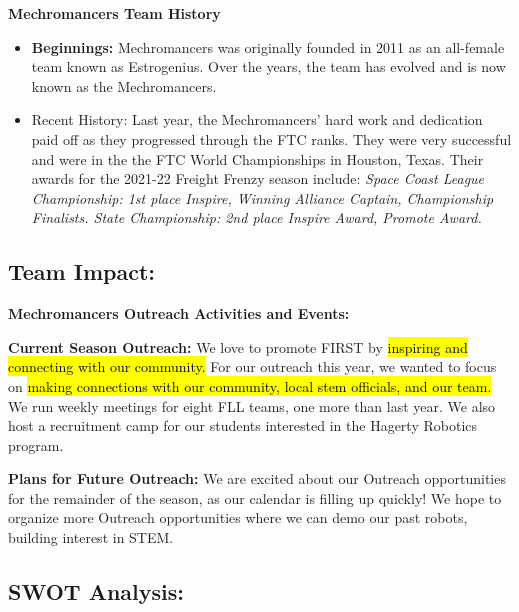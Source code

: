 \textbf{\Large Mechromancers Team History}

\begin{itemize}
\item \textbf{Beginnings:}  Mechromancers was originally founded in 2011 as an {all-female team} known as Estrogenius.  Over the years, the team has evolved and is now known as the Mechromancers.
\item {Recent History:} Last year, the Mechromancers' hard work and dedication paid off as they progressed through the FTC ranks. They were very successful and were in the { the FTC World Championships in Houston, Texas.} Their awards for the 2021-22 Freight Frenzy season include:
\textit{Space Coast League Championship: 1st place Inspire, Winning Alliance Captain, Championship Finalists. State Championship: 2nd place Inspire Award, Promote Award.}
\end{itemize}

\clearpage
{}
\subsection*{\textbf{\Huge Team Impact:}}
\vspace{.2cm}
\setlength{\parindent}{.25in} 

\textbf{\Large Mechromancers Outreach Activities and Events:}

\textbf{Current Season Outreach:} We love to promote FIRST by \hl{inspiring and connecting with our community.} For our outreach this year, we wanted to focus on \hl{making connections with our community, local stem officials, and our team.} We run weekly meetings for eight FLL teams, one more than last year. We also host a recruitment camp for our students interested in the Hagerty Robotics program.


\textbf{Plans for Future Outreach:} We are excited about our Outreach opportunities for the remainder of the season, as our calendar is filling up quickly! We hope to organize more Outreach opportunities where we can demo our past robots, building interest in STEM.


\subsection*{\textbf{\Huge SWOT Analysis:}}
\vspace{.2cm}
\setlength{\parindent}{.25in} 

